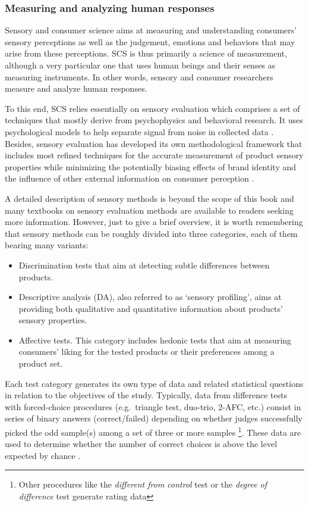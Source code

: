 \documentclass[
]{krantz}
\providecommand{\tightlist}{%
  \setlength{\itemsep}{0pt}\setlength{\parskip}{0pt}}
\begin{document}
\hypertarget{measuring-and-analyzing-human-responses}{%
\subsubsection{Measuring and analyzing human responses}\label{measuring-and-analyzing-human-responses}}

Sensory and consumer science aims at measuring and understanding consumers' sensory perceptions as well as the judgement, emotions and behaviors that may arise from these perceptions. SCS is thus primarily a science of measurement, although a very particular one that uses human beings and their senses as measuring instruments. In other words, sensory and consumer researchers measure and analyze human responses.

To this end, SCS relies essentially on sensory evaluation which comprises a set of techniques that mostly derive from psychophysics and behavioral research. It uses psychological models to help separate signal from noise in collected data \citep{lee2004, Ennis2016Thurstonian}. Besides, sensory evaluation has developed its own methodological framework that includes most refined techniques for the accurate measurement of product sensory properties while minimizing the potentially biasing effects of brand identity and the influence of other external information on consumer perception \citep{LawlessHeym2010}.

A detailed description of sensory methods is beyond the scope of this book and many textbooks on sensory evaluation methods are available to readers seeking more information. However, just to give a brief overview, it is worth remembering that sensory methods can be roughly divided into three categories, each of them bearing many variants:

\begin{itemize}
\tightlist
\item
  Discrimination tests that aim at detecting subtle differences between products.
\item
  Descriptive analysis (DA), also referred to as `sensory profiling', aims at providing both qualitative and quantitative information about products' sensory properties.
\item
  Affective tests. This category includes hedonic tests that aim at measuring consumers' liking for the tested products or their preferences among a product set.
\end{itemize}

Each test category generates its own type of data and related statistical questions in relation to the objectives of the study. Typically, data from difference tests with forced-choice procedures (e.g.~triangle test, duo-trio, 2-AFC, etc.) consist in series of binary answers (correct/failed) depending on whether judges successfully picked the odd sample(s) among a set of three or more samples \footnote{Other procedures like the \emph{different from control} test or the \emph{degree of difference} test generate rating data}. These data are used to determine whether the number of correct choices is above the level expected by chance \citep[see][ for an overview of these methods, the related theories and experimental factors]{OMahonyRousseau2003}.
\end{document}
